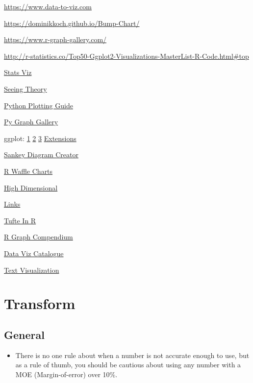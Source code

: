 \documentclass[]{book}
\providecommand{\tightlist}{%
  \setlength{\itemsep}{0pt}\setlength{\parskip}{0pt}}
\begin{document}
\url{https://www.data-to-viz.com}

\url{https://dominikkoch.github.io/Bump-Chart/}

\url{https://www.r-graph-gallery.com/}

\url{http://r-statistics.co/Top50-Ggplot2-Visualizations-MasterList-R-Code.html\#top}

\href{http://emilkirkegaard.dk/understanding_statistics/}{Stats Viz}

\href{http://students.brown.edu/seeing-theory/}{Seeing Theory}

\href{http://pythonplot.com/}{Python Plotting Guide}

\href{https://python-graph-gallery.com}{Py Graph Gallery}

ggplot: \href{https://www.pitt.edu/~naraehan/presentation/Graphs_and_Plots_using_Plotly.html}{1} \textbar{} \href{https://plot.ly/python/table/}{2} \textbar{} \href{https://plot.ly/python/html-reports/}{3} \textbar{} \href{http://www.ggplot2-exts.org/gallery/}{Extensions}

\href{http://sankeymatic.com}{Sankey Diagram Creator}

\href{https://nsaunders.wordpress.com/2017/09/08/infographic-style-charts-using-the-r-waffle-package/}{R Waffle Charts}

\href{https://research.googleblog.com/2016/12/open-sourcing-embedding-projector-tool.html}{High Dimensional}

\href{http://www.thehackerwithin.org/swinburne/links.html}{Links}

\href{http://motioninsocial.com/tufte/}{Tufte In R}

\href{http://shinyapps.org/apps/RGraphCompendium/index.php}{R Graph Compendium}

\href{http://www.datavizcatalogue.com/index.html}{Data Viz Catalogue}

\href{http://textvis.lnu.se/}{Text Visualization}

\hypertarget{transform}{%
\section{Transform}\label{transform}}

\hypertarget{general-1}{%
\subsection{General}\label{general-1}}

\begin{itemize}
\tightlist
\item
  There is no one rule about when a number is not accurate enough to use, but as a rule of thumb, you should be cautious about using any number with a MOE (Margin-of-error) over 10\%.
\end{itemize}
\end{document}
